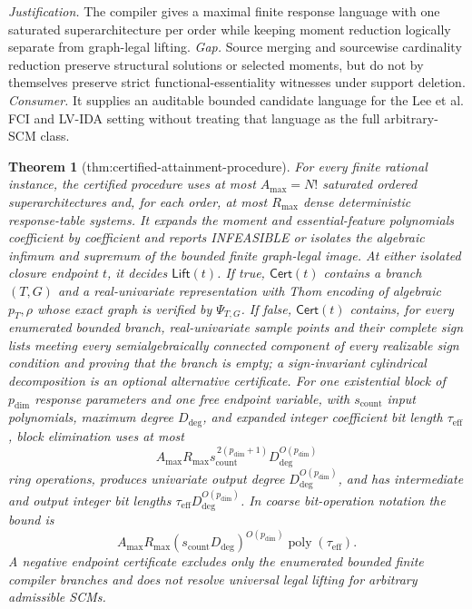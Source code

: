 \documentclass{article}
\newtheorem{theorem}{Theorem}
\begin{document}
\par\smallskip\noindent \textit{Justification.} The compiler gives a maximal finite response language with one saturated superarchitecture per order while keeping moment reduction logically separate from graph-legal lifting. \textit{Gap.} Source merging and sourcewise cardinality reduction preserve structural solutions or selected moments, but do not by themselves preserve strict functional-essentiality witnesses under support deletion. \textit{Consumer.} It supplies an auditable bounded candidate language for the Lee et al. FCI and LV-IDA setting without treating that language as the full arbitrary-SCM class.

\begin{theorem}[thm:certified-attainment-procedure]\label{thm:certified-attainment-procedure}
For every finite rational instance, the certified procedure uses at most \(A_{\max}=N!\) saturated ordered superarchitectures and, for each order, at most \(R_{\max}\) dense deterministic response-table systems.  It expands the moment and essential-feature polynomials coefficient by coefficient and reports INFEASIBLE or isolates the algebraic infimum and supremum of the bounded finite graph-legal image.  At either isolated closure endpoint \(t\), it decides \(\mathsf{Lift}(t)\).  If true, \(\mathsf{Cert}(t)\) contains a branch \((T,G)\) and a real-univariate representation with Thom encoding of algebraic \(p_T,\rho\) whose exact graph is verified by \(\Psi_{T,G}\).  If false, \(\mathsf{Cert}(t)\) contains, for every enumerated bounded branch, real-univariate sample points and their complete sign lists meeting every semialgebraically connected component of every realizable sign condition and proving that the branch is empty; a sign-invariant cylindrical decomposition is an optional alternative certificate.  For one existential block of \(p_{\mathrm{dim}}\) response parameters and one free endpoint variable, with \(s_{\mathrm{count}}\) input polynomials, maximum degree \(D_{\mathrm{deg}}\), and expanded integer coefficient bit length \(\tau_{\mathrm{eff}}\), block elimination uses at most
\[
A_{\max}R_{\max}s_{\mathrm{count}}^{\,2(p_{\mathrm{dim}}+1)}D_{\mathrm{deg}}^{O(p_{\mathrm{dim}})}
\]
ring operations, produces univariate output degree \(D_{\mathrm{deg}}^{O(p_{\mathrm{dim}})}\), and has intermediate and output integer bit lengths \(\tau_{\mathrm{eff}}D_{\mathrm{deg}}^{O(p_{\mathrm{dim}})}\).  In coarse bit-operation notation the bound is
\[
A_{\max}R_{\max}(s_{\mathrm{count}}D_{\mathrm{deg}})^{O(p_{\mathrm{dim}})}\operatorname{poly}(\tau_{\mathrm{eff}}).
\]
A negative endpoint certificate excludes only the enumerated bounded finite compiler branches and does not resolve universal legal lifting for arbitrary admissible SCMs.
\end{theorem}
\end{document}
